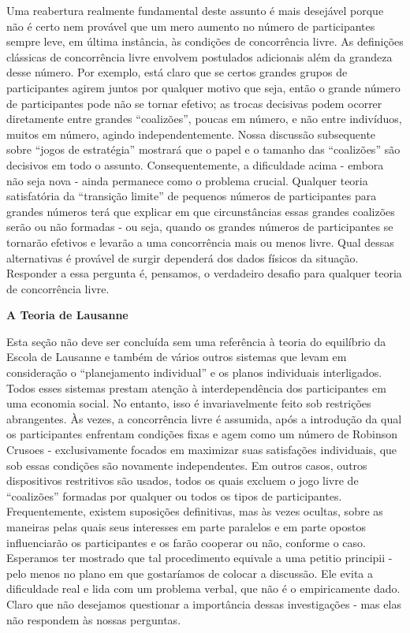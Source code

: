 \documentclass[12pt]{article}
\begin{document}
Uma reabertura realmente fundamental deste assunto é mais desejável porque não é certo nem provável que um mero aumento no número de participantes sempre leve, em última instância, às condições de concorrência livre. As definições clássicas de concorrência livre envolvem postulados adicionais além da grandeza desse número. Por exemplo, está claro que se certos grandes grupos de participantes agirem juntos por qualquer motivo que seja, então o grande número de participantes pode não se tornar efetivo; as trocas decisivas podem ocorrer diretamente entre grandes “coalizões”, poucas em número, e não entre indivíduos, muitos em número, agindo independentemente. Nossa discussão subsequente sobre “jogos de estratégia” mostrará que o papel e o tamanho das “coalizões” são decisivos em todo o assunto. Consequentemente, a dificuldade acima - embora não seja nova - ainda permanece como o problema crucial. Qualquer teoria satisfatória da “transição limite” de pequenos números de participantes para grandes números terá que explicar em que circunstâncias essas grandes coalizões serão ou não formadas - ou seja, quando os grandes números de participantes se tornarão efetivos e levarão a uma concorrência mais ou menos livre. Qual dessas alternativas é provável de surgir dependerá dos dados físicos da situação. Responder a essa pergunta é, pensamos, o verdadeiro desafio para qualquer teoria de concorrência livre.

\textbf{A Teoria de Lausanne}

Esta seção não deve ser concluída sem uma referência à teoria do equilíbrio da Escola de Lausanne e também de vários outros sistemas que levam em consideração o “planejamento individual” e os planos individuais interligados. Todos esses sistemas prestam atenção à interdependência dos participantes em uma economia social. No entanto, isso é invariavelmente feito sob restrições abrangentes. Às vezes, a concorrência livre é assumida, após a introdução da qual os participantes enfrentam condições fixas e agem como um número de Robinson Crusoes - exclusivamente focados em maximizar suas satisfações individuais, que sob essas condições são novamente independentes. Em outros casos, outros dispositivos restritivos são usados, todos os quais excluem o jogo livre de “coalizões” formadas por qualquer ou todos os tipos de participantes. Frequentemente, existem suposições definitivas, mas às vezes ocultas, sobre as maneiras pelas quais seus interesses em parte paralelos e em parte opostos influenciarão os participantes e os farão cooperar ou não, conforme o caso. Esperamos ter mostrado que tal procedimento equivale a uma petitio principii - pelo menos no plano em que gostaríamos de colocar a discussão. Ele evita a dificuldade real e lida com um problema verbal, que não é o empiricamente dado. Claro que não desejamos questionar a importância dessas investigações - mas elas não respondem às nossas perguntas.
\end{document}
